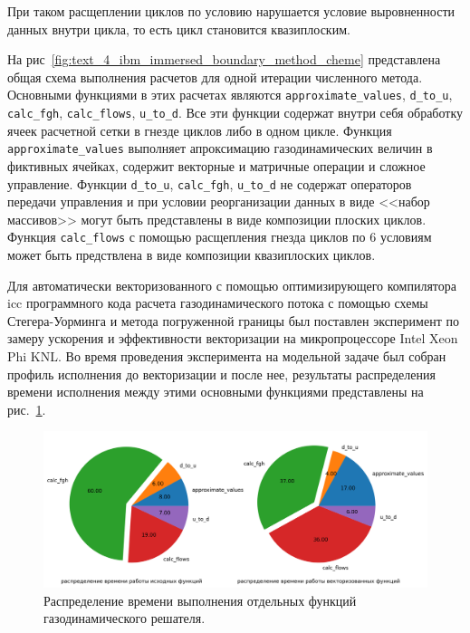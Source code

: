 При таком расщеплении циклов по условию нарушается условие выровненности данных внутри цикла, то есть цикл становится квазиплоским.

На рис~\ref{fig:text_4_ibm_immersed_boundary_method_cheme} представлена общая схема выполнения расчетов для одной итерации численного метода.
Основными функциями в этих расчетах являются \texttt{approximate\_values}, \texttt{d\_to\_u}, \texttt{calc\_fgh}, \texttt{calc\_flows}, \texttt{u\_to\_d}.
Все эти функции содержат внутри себя обработку ячеек расчетной сетки в гнезде циклов либо в одном цикле.
Функция \texttt{approximate\_values} выполняет апроксимацию газодинамических величин в фиктивных ячейках, содержит векторные и матричные операции и сложное управление.
Функции \texttt{d\_to\_u}, \texttt{calc\_fgh}, \texttt{u\_to\_d} не содержат операторов передачи управления и при условии реорганизации данных в виде <<набор массивов>> могут быть представлены в виде композиции плоских циклов.
Функция \texttt{calc\_flows} с помощью расщепления гнезда циклов по 6 условиям может быть предствлена в виде композиции квазиплоских циклов.

Для автоматически векторизованного с помощью оптимизирующего компилятора icc программного кода расчета газодинамического потока с помощью схемы Стегера-Уорминга и метода погруженной границы был поставлен эксперимент по замеру ускорения и эффективности векторизации на микропроцессоре Intel Xeon Phi KNL.
Во время проведения эксперимента на модельной задаче был собран профиль исполнения до векторизации и после нее, результаты распределения времени исполнения между этими основными функциями представлены на рис.~\ref{fig:text_4_ibm_diagr}.

\begin{figure}[ht]
\centering
\includegraphics[width=1.0\textwidth]{./fig/vec_ibm_diagr.png}
\singlespacing
{}\caption{Распределение времени выполнения отдельных функций газодинамического решателя.}
\label{fig:text_4_ibm_diagr}
\end{figure}

